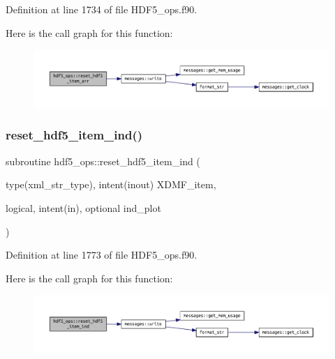 Definition at line 1734 of file H\+D\+F5\+\_\+ops.\+f90.

Here is the call graph for this function\+:
\nopagebreak
\begin{figure}[H]
\begin{center}
\leavevmode
\includegraphics[width=350pt]{namespacehdf5__ops_aed5661fcfa44910873fc0f87bb6ed914_cgraph}
\end{center}
\end{figure}
\mbox{\label{namespacehdf5__ops_a0f8db30a23145c71cb14906e7557cc33}} 
\subsubsection{\texorpdfstring{reset\+\_\+hdf5\+\_\+item\+\_\+ind()}{reset\_hdf5\_item\_ind()}}
{\footnotesize\ttfamily subroutine hdf5\+\_\+ops\+::reset\+\_\+hdf5\+\_\+item\+\_\+ind (\begin{DoxyParamCaption}\item[{type(xml\+\_\+str\+\_\+type), intent(inout)}]{X\+D\+M\+F\+\_\+item,  }\item[{logical, intent(in), optional}]{ind\+\_\+plot }\end{DoxyParamCaption})}



Definition at line 1773 of file H\+D\+F5\+\_\+ops.\+f90.

Here is the call graph for this function\+:
\nopagebreak
\begin{figure}[H]
\begin{center}
\leavevmode
\includegraphics[width=350pt]{namespacehdf5__ops_a0f8db30a23145c71cb14906e7557cc33_cgraph}
\end{center}
\end{figure}


